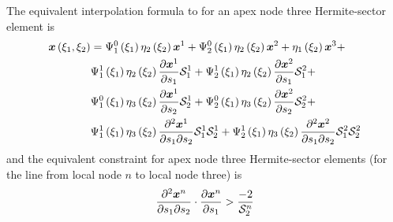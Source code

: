 The equivalent interpolation formula to  for an
apex node three Hermite-sector element is 
\begin{equation}
  \begin{split}
    \fnof{\vect{x}}{\xione,\xitwo} &=
    \chbfn{1}{0}{\xione}\hsthreebfn{2}{\xitwo}\nodept{\vect{x}}{1}+
    \chbfn{2}{0}{\xione}\hsthreebfn{2}{\xitwo}\nodept{\vect{x}}{2}+
    \hsthreebfn{1}{\xitwo}\nodept{\vect{x}}{3}+ \\
    & \chbfn{1}{1}{\xione}\hsthreebfn{2}{\xitwo}\delby{\nodept{\vect{x}}{1}}
    {s_{1}}\nsftwo{1}{1}+\chbfn{2}{1}{\xione}\hsthreebfn{2}{\xitwo}
    \delby{\nodept{\vect{x}}{2}}{s_{1}}\nsftwo{2}{1} + \\
    & \chbfn{1}{0}{\xione}\hsthreebfn{3}{\xitwo}\delby{\nodept{\vect{x}}{1}}
    {s_{2}}\nsftwo{1}{2}+\chbfn{2}{0}{\xione}\hsthreebfn{3}{\xitwo}
    \delby{\nodept{\vect{x}}{2}}{s_{2}}\nsftwo{2}{2} + \\
    & \chbfn{1}{1}{\xione}\hsthreebfn{3}{\xitwo}\deltwoby{\nodept{\vect{x}}{1}}
    {s_{1}}{s_{2}}\nsftwo{1}{1}\nsftwo{1}{2} + 
    \chbfn{2}{1}{\xione}\hsthreebfn{3}{\xitwo}\deltwoby{\nodept{\vect{x}}{2}}
    {s_{1}}{s_{2}}\nsftwo{2}{1}\nsftwo{2}{2}    
  \end{split}
  \label{eqn:hsapex3sinterp}
\end{equation}
and the equivalent constraint for apex node three Hermite-sector elements (for
the line from local node $n$ to local node three) is
\begin{equation}
  \dotprod{\deltwoby{\nodept{\vect{x}}{n}}{s_{1}}{s_{2}}}{\delby{\nodept{\vect{x}}
      {n}}{s_{1}}}>\dfrac{-2}{\nsftwo{n}{2}}
\end{equation}

